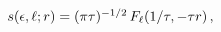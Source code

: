 $\mathop{s\/}\nolimits\!\left(\epsilon,\ell;r\right)=(\pi\tau)^{-1/2}\mathop{F_%
{\ell}\/}\nolimits\!\left(1/\tau,-\tau r\right),$